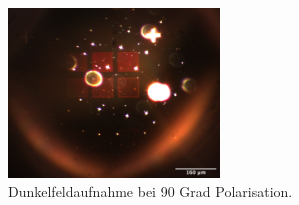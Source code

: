 \begin{figure}[h]
    \centering
    \includegraphics[width=0.5\textwidth]{Bilder/Auswertung/3.1/POL-90-image_3.png}
    \caption{Dunkelfeldaufnahme bei 90 Grad Polarisation.}
    \label{fig:314-POL90}
\end{figure}
